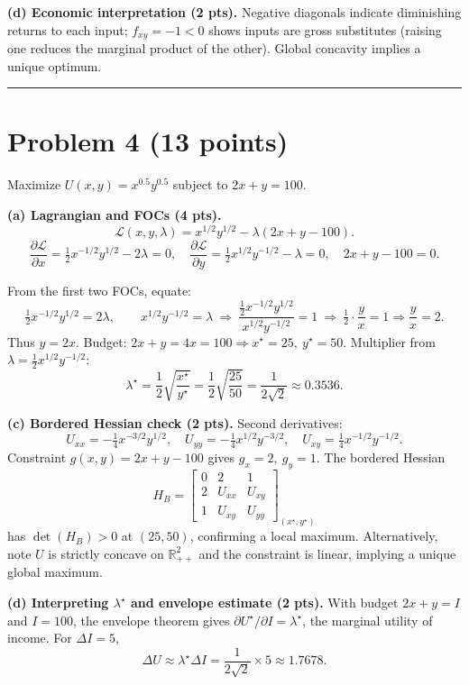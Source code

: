 \documentclass[12pt]{article}
\begin{document}
\textbf{(d) Economic interpretation (2 pts).}
Negative diagonals indicate diminishing returns to each input; \(f_{xy}=-1<0\) shows inputs are gross substitutes (raising one reduces the marginal product of the other). Global concavity implies a unique optimum.

\hrule
\vspace{8pt}

\section*{Problem 4 (13 points)}

Maximize \(U(x,y)=x^{0.5}y^{0.5}\) subject to \(2x+y=100\).

\textbf{(a) Lagrangian and FOCs (4 pts).}
\[
\mathcal{L}(x,y,\lambda)=x^{1/2}y^{1/2}-\lambda(2x+y-100).
\]
\[
\frac{\partial \mathcal{L}}{\partial x}=\tfrac{1}{2}x^{-1/2}y^{1/2}-2\lambda=0,\quad
\frac{\partial \mathcal{L}}{\partial y}=\tfrac{1}{2}x^{1/2}y^{-1/2}-\lambda=0,\quad
2x+y-100=0.
\]

From the first two FOCs, equate:
\[
\tfrac{1}{2}x^{-1/2}y^{1/2}=2\lambda,\qquad x^{1/2}y^{-1/2}=\lambda
\ \Rightarrow\ 
\frac{\tfrac{1}{2}x^{-1/2}y^{1/2}}{x^{1/2}y^{-1/2}}=1
\ \Rightarrow\ 
\tfrac{1}{2}\cdot\frac{y}{x}=1 \Rightarrow \frac{y}{x}=2.
\]
Thus \(y=2x\). Budget: \(2x+y=4x=100 \Rightarrow x^\star=25,\ y^\star=50\).
Multiplier from \(\lambda=\tfrac{1}{2}x^{1/2}y^{-1/2}\):
\[
\lambda^\star=\frac{1}{2}\sqrt{\frac{x^\star}{y^\star}}
=\frac{1}{2}\sqrt{\frac{25}{50}}=\frac{1}{2\sqrt{2}}\approx 0.3536.
\]

\textbf{(c) Bordered Hessian check (2 pts).}
Second derivatives:
\[
U_{xx}=-\tfrac{1}{4}x^{-3/2}y^{1/2},\quad
U_{yy}=-\tfrac{1}{4}x^{1/2}y^{-3/2},\quad
U_{xy}=\tfrac{1}{4}x^{-1/2}y^{-1/2}.
\]
Constraint \(g(x,y)=2x+y-100\) gives \(g_x=2,\ g_y=1\). The bordered Hessian
\[
H_B=\begin{bmatrix}
0 & 2 & 1\\
2 & U_{xx} & U_{xy}\\
1 & U_{xy} & U_{yy}
\end{bmatrix}_{(x^\star,y^\star)}
\]
has \(\det(H_B)>0\) at \((25,50)\), confirming a local maximum. Alternatively, note \(U\) is strictly concave on \(\mathbb{R}^2_{++}\) and the constraint is linear, implying a unique global maximum.

\textbf{(d) Interpreting \(\lambda^\star\) and envelope estimate (2 pts).}
With budget \(2x+y=I\) and \(I=100\), the envelope theorem gives \(\partial U^\star/\partial I=\lambda^\star\), the marginal utility of income. For \(\Delta I=5\),
\[
\Delta U \approx \lambda^\star \Delta I = \frac{1}{2\sqrt{2}}\times 5 \approx 1.7678.
\]
\end{document}
